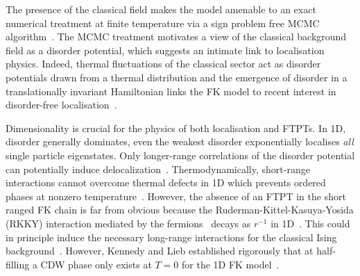 The presence of the classical field makes the model amenable to an exact numerical treatment at finite temperature via a sign problem free {MCMC} algorithm~\autocite{devriesGapsDensitiesStates1993,devriesSimplifiedHubbardModel1993,antipovInteractionTunedAndersonMott2016,debskiPossibilityDetectionFinite2016,herrmannSpreadingCorrelationsFalicovKimball2018,maskaThermodynamicsTwodimensionalFalicovKimball2006}. The {MCMC} treatment motivates a view of the classical background field as a disorder potential, which suggests an intimate link to localisation physics. Indeed, thermal fluctuations of the classical sector act as disorder potentials drawn from a thermal distribution and the emergence of disorder in a translationally invariant Hamiltonian links the {FK} model to recent interest in disorder-free localisation~\autocite{smithDisorderFreeLocalization2017,smithDynamicalLocalizationMathbbZ2018,brenesManyBodyLocalizationDynamics2018}.

Dimensionality is crucial for the physics of both localisation and {FTPTs}. In 1D, disorder generally dominates, even the weakest disorder exponentially localises \emph{all} single particle eigenstates. Only longer-range correlations of the disorder potential can potentially induce delocalization~\autocite{aubryAnalyticityBreakingAnderson1980,dassarmaLocalizationMobilityEdges1990,dunlapAbsenceLocalizationRandomdimer1990}. Thermodynamically, short-range interactions cannot overcome thermal defects in 1D which prevents ordered phases at nonzero temperature~\autocite{andersonAbsenceDiffusionCertain1958,goldshteinPurePointSpectrum1977,abrahamsScalingTheoryLocalization1979,kramerLocalizationTheoryExperiment1993}. However, the absence of an {FTPT} in the short ranged {FK} chain is far from obvious because the Ruderman-Kittel-Kasuya-Yosida (RKKY) interaction mediated by the fermions~\autocite{kasuyaTheoryMetallicFerro1956,rudermanIndirectExchangeCoupling1954,vanvleckNoteInteractionsSpins1962,yosidaMagneticPropertiesCuMn1957} decays as \(r^{-1}\) in 1D~\autocite{rusinCalculationRKKYRange2017a}. This could in principle induce the necessary long-range interactions for the classical Ising background~\autocite{thoulessLongRangeOrderOneDimensional1969,peierlsIsingModelFerromagnetism1936}. However, Kennedy and Lieb established rigorously that at half-filling a {CDW} phase only exists at \(T = 0\) for the 1D {FK} model~\autocite{kennedyItinerantElectronModel1986}.

